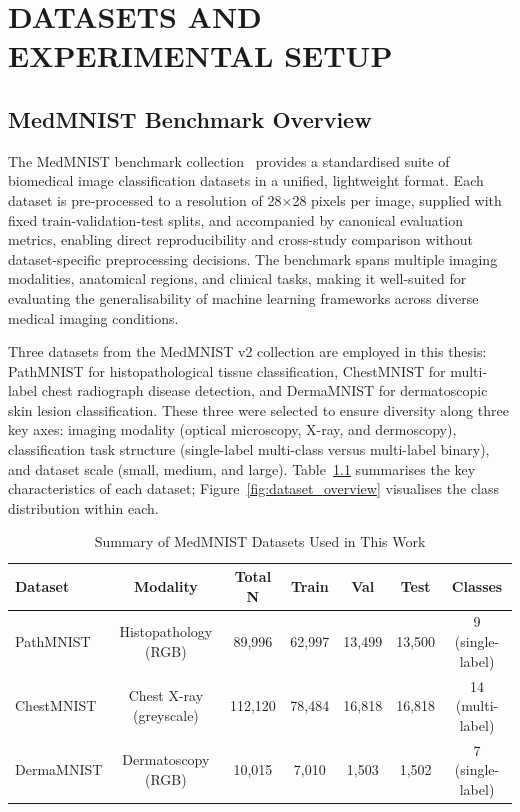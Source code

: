 
\chapter{DATASETS AND EXPERIMENTAL SETUP}

\section{MedMNIST Benchmark Overview}

The MedMNIST benchmark collection~\cite{yang2021medmnist} provides a standardised suite of biomedical image classification datasets in a unified, lightweight format. Each dataset is pre-processed to a resolution of 28$\times$28 pixels per image, supplied with fixed train-validation-test splits, and accompanied by canonical evaluation metrics, enabling direct reproducibility and cross-study comparison without dataset-specific preprocessing decisions. The benchmark spans multiple imaging modalities, anatomical regions, and clinical tasks, making it well-suited for evaluating the generalisability of machine learning frameworks across diverse medical imaging conditions.

Three datasets from the MedMNIST v2 collection are employed in this thesis: PathMNIST for histopathological tissue classification, ChestMNIST for multi-label chest radiograph disease detection, and DermaMNIST for dermatoscopic skin lesion classification. These three were selected to ensure diversity along three key axes: imaging modality (optical microscopy, X-ray, and dermoscopy), classification task structure (single-label multi-class versus multi-label binary), and dataset scale (small, medium, and large). Table~\ref{tab:medmnist_overview} summarises the key characteristics of each dataset; Figure~\ref{fig:dataset_overview} visualises the class distribution within each.

\begin{table}[h]
\footnotesize
\centering
\caption{Summary of MedMNIST Datasets Used in This Work}
\label{tab:medmnist_overview}
\begin{tabular}{lcccccc}
\toprule
\textbf{Dataset} & \textbf{Modality} & \textbf{Total N} & \textbf{Train} & \textbf{Val} & \textbf{Test} & \textbf{Classes} \\
\midrule
PathMNIST   & Histopathology (RGB)    & 89,996  & 62,997 & 13,499 & 13,500 & 9 (single-label) \\
ChestMNIST  & Chest X-ray (greyscale) & 112,120 & 78,484 & 16,818 & 16,818 & 14 (multi-label) \\
DermaMNIST  & Dermatoscopy (RGB)      & 10,015  &  7,010 &  1,503 &  1,502 & 7 (single-label) \\
\bottomrule
\end{tabular}
\end{table}

